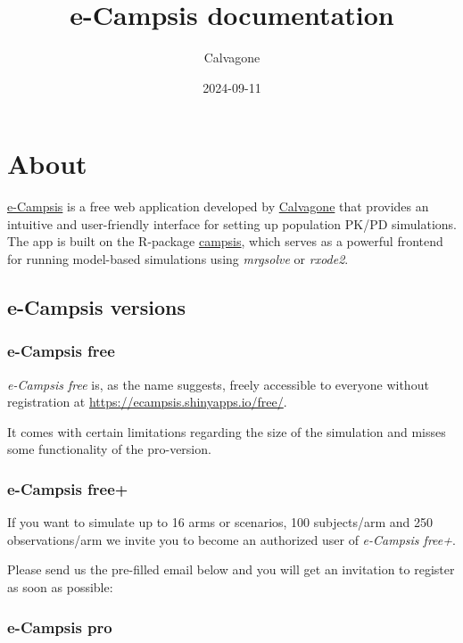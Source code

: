 \documentclass[
]{book}
\title{e-Campsis documentation}
\author{Calvagone}
\date{2024-09-11}
\begin{document}
\maketitle

{
\setcounter{tocdepth}{1}
\tableofcontents
}
\chapter{About}\label{about}

\href{https://ecampsis.shinyapps.io/free/}{e-Campsis} is a free web application developed by \href{https://www.calvagone.com/}{Calvagone} that provides an intuitive and user-friendly interface for setting up population PK/PD simulations. The app is built on the R-package \href{https://calvagone.github.io/}{campsis}, which serves as a powerful frontend for running model-based simulations using \emph{mrgsolve} or \emph{rxode2}.

\section{e-Campsis versions}\label{e-campsis-versions}

\subsection{e-Campsis free}\label{e-campsis-free}

\emph{e-Campsis free} is, as the name suggests, freely accessible to everyone without registration at \url{https://ecampsis.shinyapps.io/free/}.

It comes with certain limitations regarding the size of the simulation and misses some functionality of the pro-version.

\subsection{e-Campsis free+}\label{e-campsis-free-1}

If you want to simulate up to 16 arms or scenarios, 100 subjects/arm and 250 observations/arm we invite you to become an authorized user of \emph{e-Campsis free+}.

Please send us the pre-filled email below and you will get an invitation to register as soon as possible:

\subsection{e-Campsis pro}\label{e-campsis-pro}
\end{document}
